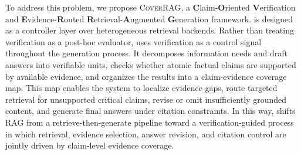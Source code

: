 
To address this problem, we propose \textsc{CoverRAG}, a \textbf{C}laim-\textbf{O}riented \textbf{V}erification and \textbf{E}vidence-\textbf{R}outed \textbf{R}etrieval-\textbf{A}ugmented \textbf{G}eneration framework. \ragname is designed as a controller layer over heterogeneous retrieval backends. Rather than treating verification as a post-hoc evaluator, \ragname uses verification as a control signal throughout the generation process. It decomposes information needs and draft answers into verifiable units, checks whether atomic factual claims are supported by available evidence, and organizes the results into a claim-evidence coverage map. This map enables the system to localize evidence gaps, route targeted retrieval for unsupported critical claims, revise or omit insufficiently grounded content, and generate final answers under citation constraints. In this way, \ragname shifts RAG from a retrieve-then-generate pipeline toward a verification-guided process in which retrieval, evidence selection, answer revision, and citation control are jointly driven by claim-level evidence coverage.

